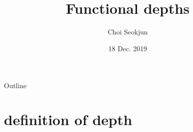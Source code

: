 \documentclass[aspectratio=169,ignorenonframetext,9pt]{beamer}
\title{Functional depths}
\author{Choi Seokjun}
\date{18 Dec. 2019}
\theoremstyle{plain}
\theoremstyle{definition}
\begin{document}
\begin{frame}
\maketitle
\end{frame}




\begin{frame}{Outline}
\tableofcontents
\end{frame}



\section{definition of depth}
\end{document}
